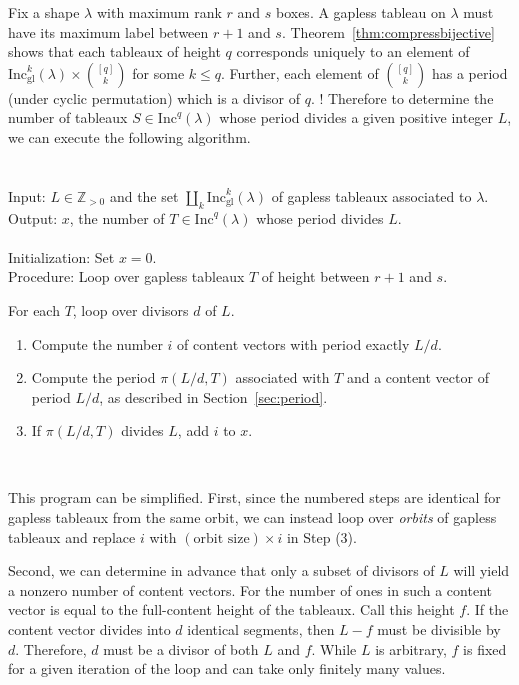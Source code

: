 \documentclass[12pt]{amsart}
\theoremstyle{definition}
\theoremstyle{remark}
\numberwithin{equation}{section}
\newcommand{\inc}{\ensuremath{\mathrm{Inc}}}
\newcommand{\incgl}{\inc_{\mathrm{gl}}}
\begin{document}
Fix a shape $\lambda$ with maximum rank $r$ and $s$ boxes.  A gapless tableau on $\lambda$ must have its maximum label between $r+1$ and $s$.  Theorem~\ref{thm:compressbijective} shows that each tableaux of height $q$ corresponds uniquely to an element of $\incgl^k(\lambda) \times \binom{[q]}{k}$ for some $k \leq q$. Further, each element of $\binom{[q]}{k}$ has a period (under cyclic permutation) which is a divisor of $q$. ! Therefore to determine the number of tableaux $S \in \inc^q(\lambda)$ whose period divides a given positive integer $L$, we can execute the following algorithm.
\-\ \\ \-\ \\ 
 \\ \noindent
\textsf{Input}:  $L \in \mathbb{Z}_{>0}$ and the set $\coprod_k \incgl^k(\lambda)$ of gapless tableaux associated to $\lambda$. \\ \noindent
\textsf{Output}: $x$, the number of $T \in \inc^q(\lambda)$ whose period divides $L$. \\  \-\ \\ 
\textsf{Initialization}: Set $x = 0$. \\
\textsf{Procedure}: Loop over gapless tableaux $T$ of height between $r+1$ and $s$.
\begin{arrowlist}
\item For each $T$, loop over divisors $d$ of $L$.
\begin{enumerate}
\item   Compute the number $i$ of content vectors with period exactly $L/d$. \item Compute the period $\pi(L/d,T)$ associated with $T$ and a content vector of period $L/d$, as described in Section~\ref{sec:period}. 
\item If $\pi(L/d,T)$ divides $L$, add $i$ to $x$.
\end{enumerate}
\end{arrowlist} \-\ 

This program can be simplified. First, since the numbered steps are identical for gapless tableaux from the same orbit, we can instead loop over {\it orbits} of gapless tableaux and replace $i$ with $(\text{orbit size}) \times i$ in Step (3).

Second, we can determine in advance that only a subset of divisors of $L$ will yield a nonzero number of content vectors. For the number of ones in such a content vector is equal to the full-content height of the tableaux. Call this height $f$. If the content vector divides into $d$ identical segments, then $L-f$ must be divisible by $d$. Therefore, $d$ must be a divisor of both $L$ and $f$. While $L$ is arbitrary, $f$ is fixed for a given iteration of the loop and can take only finitely many values. 
\end{document}
